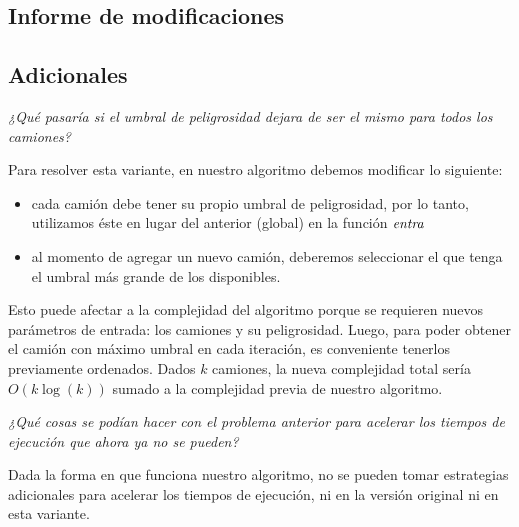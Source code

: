 \subsection{Informe de modificaciones}

\newpage

\subsection{Adicionales}

\textit{¿Qué pasaría si el umbral de peligrosidad dejara de ser el mismo para todos los
camiones?}

\vspace*{0.25cm}

Para resolver esta variante, en nuestro algoritmo debemos modificar lo
siguiente:
\begin{itemize}
  \item cada camión debe tener su propio umbral de peligrosidad, por lo tanto,
        utilizamos éste en lugar del anterior (global) en la función $\id{entra}$

  \item al momento de agregar un nuevo camión, deberemos seleccionar el que tenga
        el umbral más grande de los disponibles.
\end{itemize}

Esto puede afectar a la complejidad del algoritmo porque se requieren nuevos
parámetros de entrada: los camiones y su peligrosidad.
Luego, para poder obtener el camión con máximo umbral en cada iteración, es
conveniente tenerlos previamente ordenados.
Dados $k$ camiones, la nueva complejidad total sería $O(k \log(k))$ sumado a la
complejidad previa de nuestro algoritmo.

\vspace*{0.5cm}

\textit{¿Qué cosas se podían hacer con el problema anterior para acelerar los tiempos de
ejecución que ahora ya no se pueden?}

\vspace*{0.25cm}

Dada la forma en que funciona nuestro algoritmo, no se pueden tomar estrategias adicionales
para acelerar los tiempos de ejecución, ni en la versión original ni en esta variante.
